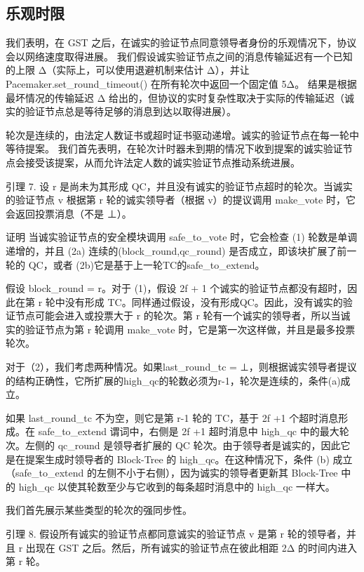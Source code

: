 \subsection{乐观时限}

我们表明，在 GST 之后，在诚实的验证节点同意领导者身份的乐观情况下，协议会以网络速度取得进展。 我们假设诚实验证节点之间的消息传输延迟有一个已知的上限 Δ（实际上，可以使用退避机制来估计 Δ），并让 Pacemaker.set\_round\_timeout() 在所有轮次中返回一个固定值 5Δ。 结果是根据最坏情况的传输延迟 Δ 给出的，但协议的实时复杂性取决于实际的传输延迟（诚实的验证节点总是等待足够的消息到达以取得进展）。

轮次是连续的，由法定人数证书或超时证书驱动递增。诚实的验证节点在每一轮中等待提案。 我们首先表明，在轮次计时器未到期的情况下收到提案的诚实验证节点会接受该提案，从而允许法定人数的诚实验证节点推动系统进展。

引理 7. 设 r 是尚未为其形成 QC，并且没有诚实的验证节点超时的轮次。当诚实的验证节点 v 根据第 r 轮的诚实领导者（根据 v）的提议调用 make\_vote 时，它​​会返回投票消息（不是 ⊥）。

证明 当诚实验证节点的安全模块调用 safe\_to\_vote 时，它​​会检查 (1) 轮数是单调递增的，并且 (2a) 连续的(block\_round,qc\_round) 是否成立，即该块扩展了前一轮的 QC，或者 (2b)它是基于上一轮TC的safe\_to\_extend。

假设 block\_round = r。对于 (1)，假设 2f + 1 个诚实的验证节点都没有超时，因此在第 r 轮中没有形成 TC。同样通过假设，没有形成QC。因此，没有诚实的验证节点可能会进入或投票大于 r 的轮次。第 r 轮有一个诚实的领导者，所以当诚实的验证节点为第 r 轮调用 make\_vote 时，它​​是第一次这样做，并且是最多投票轮次。

对于（2），我们考虑两种情况。如果last\_round\_tc = ⊥，则根据诚实领导者提议的结构正确性，它所扩展的high\_qc的轮数必须为r-1，轮次是连续的，条件(a)成立。

如果 last\_round\_tc 不为空，则它是第 r-1 轮的 TC，基于 2f +1 个超时消息形成。在 safe\_to\_extend 谓词中，右侧是 2f +1 超时消息中 high\_qc 中的最大轮次。左侧的 qc\_round 是领导者扩展的 QC 轮次。由于领导者是诚实的，因此它是在提案生成时领导者的 Block-Tree 的 high\_qc。在这种情况下，条件 (b) 成立（safe\_to\_extend 的左侧不小于右侧），因为诚实的领导者更新其 Block-Tree 中的 high\_qc 以使其轮数至少与它收到的每条超时消息中的 high\_qc 一样大。

我们首先展示某些类型的轮次的强同步性。

引理 8. 假设所有诚实的验证节点都同意诚实的验证节点 v 是第 r 轮的领导者，并且 r 出现在 GST 之后。然后，所有诚实的验证节点在彼此相距 2Δ 的时间内进入第 r 轮。

